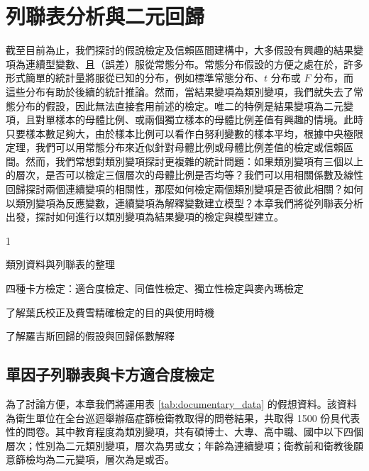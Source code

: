 \chapter{列聯表分析與二元回歸}

    截至目前為止，我們探討的假說檢定及信賴區間建構中，大多假設有興趣的結果變項為連續型變數、且（誤差）服從常態分布。常態分布假設的方便之處在於，許多形式簡單的統計量將服從已知的分布，例如標準常態分布、$t$ 分布或 $F$ 分布，而這些分布有助於後續的統計推論。然而，當結果變項為類別變項，我們就失去了常態分布的假設，因此無法直接套用前述的檢定。唯二的特例是結果變項為二元變項，且對單樣本的母體比例、或兩個獨立樣本的母體比例差值有興趣的情境。此時只要樣本數足夠大，由於樣本比例可以看作白努利變數的樣本平均，根據中央極限定理，我們可以用常態分布來近似針對母體比例或母體比例差值的檢定或信賴區間。然而，我們常想對類別變項探討更複雜的統計問題：如果類別變項有三個以上的層次，是否可以檢定三個層次的母體比例是否均等？我們可以用相關係數及線性回歸探討兩個連續變項的相關性，那麼如何檢定兩個類別變項是否彼此相關？如何以類別變項為反應變數，連續變項為解釋變數建立模型？本章我們將從列聯表分析出發，探討如何進行以類別變項為結果變項的檢定與模型建立。
    
    \begin{introduction}{1}
        \item 類別資料與列聯表的整理
        \item 四種卡方檢定：適合度檢定、同值性檢定、獨立性檢定與麥內瑪檢定
        \item 了解葉氏校正及費雪精確檢定的目的與使用時機
        \item 了解羅吉斯回歸的假設與回歸係數解釋
    \end{introduction}

\section{單因子列聯表與卡方適合度檢定}

    為了討論方便，本章我們將運用表 \ref{tab:documentary_data} 的假想資料。該資料為衛生單位在全台巡迴舉辦癌症篩檢衛教取得的問卷結果，共取得 1500 份具代表性的問卷。其中教育程度為類別變項，共有碩博士、大專、高中職、國中以下四個層次；性別為二元類別變項，層次為男或女；年齡為連續變項；衛教前和衛教後願意篩檢均為二元變項，層次為是或否。
    
